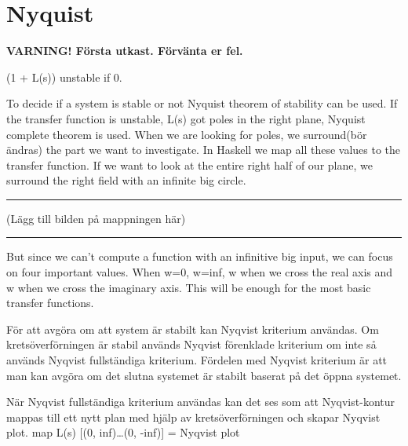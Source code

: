 \section{Nyquist}
\textbf{VARNING! Första utkast. Förvänta er fel.}

(1 + L(s)) unstable if 0.

To decide if a system is stable or not Nyquist theorem of stability can be used. If the transfer function is unstable, L(s) got poles in the right plane, Nyquist complete theorem is used. When we are looking for poles, we surround(bör ändras) the part we want to investigate. In Haskell we map all these values to the transfer function. If we want to look at the entire right half of our plane, we surround the right field with an infinite big circle.
\hrule
(Lägg till bilden på mappningen här)
\hrule
But since we can’t compute a function with an infinitive big input, we can focus on four important values. When w=0, w=inf, w when we cross the real axis and w when we cross the imaginary axis. This will be enough for the most basic transfer functions.

För att avgöra om att system är stabilt kan Nyqvist kriterium användas. Om kretsöverförningen är stabil används Nyqvist förenklade kriterium om inte så används Nyqvist fullständiga kriterium. Fördelen med Nyqvist kriterium är att man kan avgöra om det slutna systemet är stabilt baserat på det öppna systemet.

När Nyqvist fullständiga kriterium användas kan det ses som att Nyqvist-kontur mappas till ett nytt plan med hjälp av kretsöverförningen och skapar Nyqvist plot.
map L(s) [(0, inf)…(0, -inf)] = Nyqvist plot
